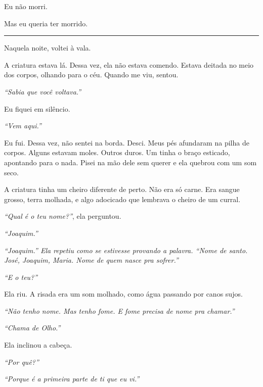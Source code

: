 \noindent Eu não morri.

\noindent Mas eu queria ter morrido.

\vspace{0.5em}\noindent\rule{\textwidth}{0.5pt}\vspace{0.5em}

\noindent Naquela noite, voltei à vala.

\noindent A criatura estava lá. Dessa vez, ela não estava comendo. Estava deitada no meio dos corpos, olhando para o céu. Quando me viu, sentou.

\noindent \textit{\textquotedblleft{}Sabia que você voltava.\textquotedblright{}}

\noindent Eu fiquei em silêncio.

\noindent \textit{\textquotedblleft{}Vem aqui.\textquotedblright{}}

\noindent Eu fui. Dessa vez, não sentei na borda. Desci. Meus pés afundaram na pilha de corpos. Alguns estavam moles. Outros duros. Um tinha o braço esticado, apontando para o nada. Pisei na mão dele sem querer e ela quebrou com um som seco.

\noindent A criatura tinha um cheiro diferente de perto. Não era só carne. Era sangue grosso, terra molhada, e algo adocicado que lembrava o cheiro de um curral.

\noindent \textit{\textquotedblleft{}Qual é o teu nome?\textquotedblright{}}, ela perguntou.

\noindent \textit{\textquotedblleft{}Joaquim.\textquotedblright{}}

\noindent \textit{\textquotedblleft{}Joaquim.\textquotedblright{}\textit{ Ela repetiu como se estivesse provando a palavra. }\textquotedblleft{}Nome de santo. José, Joaquim, Maria. Nome de quem nasce pra sofrer.\textquotedblright{}}

\noindent \textit{\textquotedblleft{}E o teu?\textquotedblright{}}

\noindent Ela riu. A risada era um som molhado, como água passando por canos sujos.

\noindent \textit{\textquotedblleft{}Não tenho nome. Mas tenho fome. E fome precisa de nome pra chamar.\textquotedblright{}}

\noindent \textit{\textquotedblleft{}Chama de Olho.\textquotedblright{}}

\noindent Ela inclinou a cabeça.

\noindent \textit{\textquotedblleft{}Por quê?\textquotedblright{}}

\noindent \textit{\textquotedblleft{}Porque é a primeira parte de ti que eu vi.\textquotedblright{}}


